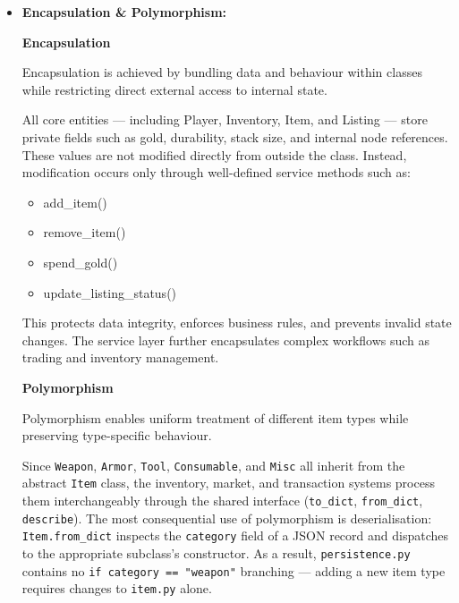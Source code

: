 \documentclass[11pt,a4paper]{article}
\begin{document}
\begin{itemize}
    Key compositional relationships include:
    \begin{itemize}
        \item A Player has an Inventory
        \item An Inventory contains multiple Item instances
        \item A Market Listing belongs to a Player and references an Item
        \item A Transaction records a buyer, seller, and traded item
    \end{itemize}

    The inventory is implemented as a doubly linked list, and market listings use a binary search tree (BST) for sorted access. These data structures are composed inside service and domain classes, demonstrating how complex systems are built from independent, reusable objects.


    \item \textbf{Encapsulation \& Polymorphism:}

    \textbf{Encapsulation}

    Encapsulation is achieved by bundling data and behaviour within classes while restricting direct external access to internal state.

    All core entities — including Player, Inventory, Item, and Listing — store private fields such as gold, durability, stack size, and internal node references. These values are not modified directly from outside the class. Instead, modification occurs only through well-defined service methods such as:
    \begin{itemize}
        \item add\_item()
        \item remove\_item()
        \item spend\_gold()
        \item update\_listing\_status()
    \end{itemize}

    This protects data integrity, enforces business rules, and prevents invalid state changes. The service layer further encapsulates complex workflows such as trading and inventory management.

    \textbf{Polymorphism}

    Polymorphism enables uniform treatment of different item types while preserving type-specific behaviour.

    Since \texttt{Weapon}, \texttt{Armor}, \texttt{Tool}, \texttt{Consumable}, and \texttt{Misc} all inherit from the abstract \texttt{Item} class, the inventory, market, and transaction systems process them interchangeably through the shared interface (\texttt{to\_dict}, \texttt{from\_dict}, \texttt{describe}). The most consequential use of polymorphism is deserialisation: \texttt{Item.from\_dict} inspects the \texttt{category} field of a JSON record and dispatches to the appropriate subclass's constructor. As a result, \texttt{persistence.py} contains no \texttt{if category == "weapon"} branching — adding a new item type requires changes to \texttt{item.py} alone.


\end{itemize}
\end{document}
